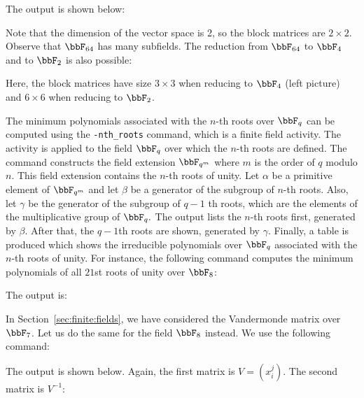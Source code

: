 
The output is shown below: 


Note that the dimension of the vector space is 2, 
so the block matrices are $2 \times 2.$
Observe that $\bbF_{64}$ has many subfields. 
The reduction from $\bbF_{64}$ to $\bbF_4$ and to $\bbF_2$ is also possible:


Here, the block matrices have size $3 \times 3$ 
when reducing to $\bbF_4$ (left picture) 
and $6 \times 6$ when reducing to $\bbF_2$.

\bigskip

The minimum polynomials associated with the $n$-th roots 
over $\bbF_q$ can be computed using the \verb'-nth_roots' command, which is a 
finite field activity. 
The activity is applied to the field $\bbF_q$ 
over which the $n$-th roots are defined.
The command constructs the field extension $\bbF_{q^m}$ 
where $m$ is the order of $q$ modulo $n$. 
This field extension contains the $n$-th roots of unity. 
Let $\alpha$ be a primitive element of $\bbF_{q^m}$ 
and let $\beta$ be a generator of the subgroup of $n$-th roots. 
Also, let $\gamma$ be the generator of the subgroup of $q-1$ th roots, 
which are the elements of the multiplicative group of $\bbF_q.$ 
The output lists the $n$-th roots first, generated by $\beta$. 
After that, the $q-1$th roots are shown, generated by $\gamma$. 
Finally, a table is produced which shows the irreducible polynomials 
over $\bbF_q$ associated with the $n$-th roots of unity.
For instance, the following command computes the minimum polynomials 
of all $21$st roots of unity over $\bbF_8$:


The output is:



\bigskip

In Section~\ref{sec:finite:fields}, 
we have considered the Vandermonde matrix over $\bbF_7$. 
Let us do the same for the field $\bbF_8$ instead. 
We use the following command:


The output is shown below. 
Again, the first matrix is $V = (x_{i}^j).$ The second matrix is $V^{-1}$:

